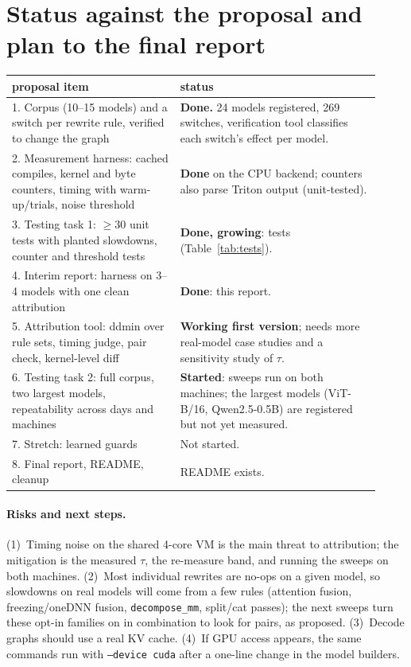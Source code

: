 \documentclass[11pt]{article}
\newcommand{\code}[1]{\texttt{#1}}
\begin{document}
\section{Status against the proposal and plan to the final report}
\begin{table}[h]\centering\small
\begin{tabular}{p{0.42\linewidth}p{0.5\linewidth}}\toprule
proposal item & status \\\midrule
1. Corpus (10--15 models) and a switch per rewrite rule, verified to change the graph &
  \textbf{Done.} 24 models registered, 269 switches, verification tool classifies each switch's effect per model. \\
2. Measurement harness: cached compiles, kernel and byte counters, timing with warm-up/trials, noise threshold &
  \textbf{Done} on the CPU backend; counters also parse Triton output (unit-tested). \\
3. Testing task 1: $\ge 30$ unit tests with planted slowdowns, counter and threshold tests &
  \textbf{Done, growing}: tests (Table~\ref{tab:tests}). \\
4. Interim report: harness on 3--4 models with one clean attribution &
  \textbf{Done}: this report. \\
5. Attribution tool: ddmin over rule sets, timing judge, pair check, kernel-level diff &
  \textbf{Working first version}; needs more real-model case studies and a sensitivity study of $\tau$. \\
6. Testing task 2: full corpus, two largest models, repeatability across days and machines &
  \textbf{Started}: sweeps run on both machines; the largest models (ViT-B/16, Qwen2.5-0.5B) are registered but not yet measured. \\
7. Stretch: learned guards & Not started. \\
8. Final report, README, cleanup & README exists. \\
\bottomrule\end{tabular}
\end{table}

\paragraph{Risks and next steps.}
(1)~Timing noise on the shared 4-core VM is the main threat to attribution; the mitigation is the
measured $\tau$, the re-measure band, and running the sweeps on both machines. (2)~Most individual
rewrites are no-ops on a given model, so slowdowns on real models will come from a few rules
(attention fusion, freezing/oneDNN fusion, \code{decompose\_mm}, split/cat passes); the next sweeps
turn these opt-in families on in combination to look for pairs, as proposed. (3)~Decode graphs
should use a real KV cache. (4)~If GPU access appears, the same commands run with
\code{--device cuda} after a one-line change in the model builders.
\end{document}
